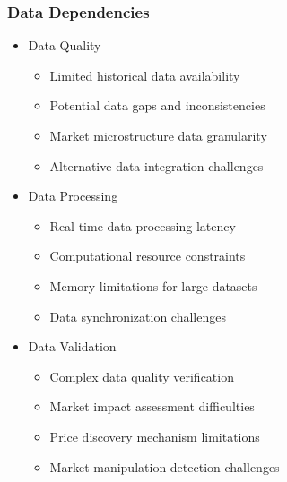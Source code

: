 \documentclass[conference]{IEEEtran}
\begin{document}
\subsubsection{Data Dependencies}
\begin{itemize}
    \item Data Quality
    \begin{itemize}
        \item Limited historical data availability
        \item Potential data gaps and inconsistencies
        \item Market microstructure data granularity
        \item Alternative data integration challenges
    \end{itemize}
    
    \item Data Processing
    \begin{itemize}
        \item Real-time data processing latency
        \item Computational resource constraints
        \item Memory limitations for large datasets
        \item Data synchronization challenges
    \end{itemize}
    
    \item Data Validation
    \begin{itemize}
        \item Complex data quality verification
        \item Market impact assessment difficulties
        \item Price discovery mechanism limitations
        \item Market manipulation detection challenges
    \end{itemize}
\end{itemize}
\end{document}
